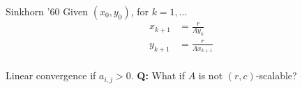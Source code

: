 \documentclass{beamer}
\begin{document}
\begin{frame}
  \frametitle{}

  \begin{block}{Sinkhorn '60}
    Given $(x_0, y_0)$, for $k=1,\dots$
    \begin{equation}
      \begin{aligned}
        x_{k+1}&= \frac{r}{A y_k} \\
        y_{k+1}&= \frac{r}{A x_{k+1}} \\
      \end{aligned}
    \end{equation}
  \end{block}
  Linear convergence if $a_{i,j} > 0$.
  \textbf{Q:} What if $A$ is not $(r,c)$-scalable?
\end{frame}
\end{document}
